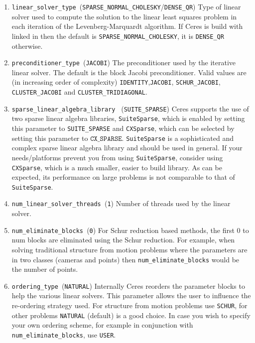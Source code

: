 \begin{enumerate}
\item{\texttt{linear\_solver\_type }}(\texttt{SPARSE\_NORMAL\_CHOLESKY}/\texttt{DENSE\_QR}) Type of linear solver used to compute the solution to the linear least squares problem in each iteration of the Levenberg-Marquardt algorithm. If Ceres is build with \suitesparse linked in  then the default is \texttt{SPARSE\_NORMAL\_CHOLESKY}, it is \texttt{DENSE\_QR} otherwise.

\item{\texttt{preconditioner\_type }}(\texttt{JACOBI}) The preconditioner used by the iterative linear solver. The default is the block Jacobi preconditioner. Valid values are (in increasing order of complexity) \texttt{IDENTITY},\texttt{JACOBI}, \texttt{SCHUR\_JACOBI}, \texttt{CLUSTER\_JACOBI} and \texttt{CLUSTER\_TRIDIAGONAL}.

\item{\texttt{sparse\_linear\_algebra\_library } (\texttt{SUITE\_SPARSE})} Ceres supports the use of two sparse linear algebra libraries, \texttt{SuiteSparse}, which is enabled by setting this parameter to \texttt{SUITE\_SPARSE} and \texttt{CXSparse}, which can be selected by setting this parameter to $\texttt{CX\_SPARSE}$. \texttt{SuiteSparse} is a sophisticated and complex sparse linear algebra library and should be used in general. If your needs/platforms prevent you from using \texttt{SuiteSparse}, consider using \texttt{CXSparse}, which is a much smaller, easier to build library. As can be expected, its performance on large problems is not comparable to that of \texttt{SuiteSparse}.


\item{\texttt{num\_linear\_solver\_threads }}(\texttt{1}) Number of threads used by the linear solver. 

\item{\texttt{num\_eliminate\_blocks }}(\texttt{0}) 
For Schur reduction based methods, the first 0 to num blocks are
    eliminated using the Schur reduction. For example, when solving
     traditional structure from motion problems where the parameters are in
     two classes (cameras and points) then \texttt{num\_eliminate\_blocks} would be the
     number of points.

\item{\texttt{ordering\_type }}(\texttt{NATURAL})
 Internally Ceres reorders the parameter blocks to help the
 various linear solvers. This parameter allows the user to
     influence the re-ordering strategy used. For structure from
     motion problems use \texttt{SCHUR}, for other problems \texttt{NATURAL} (default)
     is a good choice. In case you wish to specify your own ordering
     scheme, for example in conjunction with \texttt{num\_eliminate\_blocks},
     use \texttt{USER}.


\end{enumerate}
